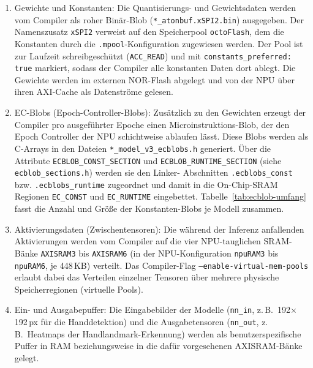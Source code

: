\begin{enumerate}
  \item Gewichte und Konstanten: Die Quantisierungs- und Gewichtsdaten werden vom Compiler als roher Binär-Blob (\texttt{*\_atonbuf.xSPI2.bin}) ausgegeben. Der Namenszusatz \texttt{xSPI2} verweist auf den Speicherpool \texttt{octoFlash}, dem die Konstanten durch die \texttt{.mpool}-Konfiguration zugewiesen werden. Der Pool ist zur Laufzeit schreibgeschützt (\texttt{ACC\_READ}) und mit \texttt{constants\_preferred: true} markiert, sodass der Compiler alle konstanten Daten dort ablegt. Die Gewichte werden im externen NOR-Flash abgelegt und von der NPU über ihren AXI-Cache als Datenströme gelesen.

  \item EC-Blobs (Epoch-Controller-Blobs): Zusätzlich zu den Gewichten erzeugt der Compiler pro ausgeführter Epoche einen Microinstruktions-Blob, der den Epoch Controller der NPU schichtweise ablaufen lässt. Diese Blobs werden als C-Arrays in den Dateien \texttt{*\_model\_v3\_ecblobs.h} generiert. Über die Attribute \texttt{ECBLOB\_CONST\_SECTION} und \texttt{ECBLOB\_RUNTIME\_SECTION} (siehe \texttt{ecblob\_sections.h}) werden sie den Linker- \linebreak Abschnitten \texttt{.ecblobs\_const} bzw. \texttt{.ecblobs\_runtime} zugeordnet und damit in die On-Chip-SRAM Regionen \texttt{EC\_CONST} und \texttt{EC\_RUNTIME} eingebettet. Tabelle~\ref{tab:ecblob-umfang} fasst die Anzahl und Größe der Konstanten-Blobs je Modell zusammen.

  \item Aktivierungsdaten (Zwischentensoren): Die während der Inferenz anfallenden Aktivierungen werden vom Compiler auf die vier NPU-tauglichen SRAM-Bänke \texttt{AXISRAM3} bis \texttt{AXISRAM6} (in der NPU-Konfiguration \texttt{npuRAM3} bis \texttt{npuRAM6}, je 448\,KB) verteilt. Das Compiler-Flag \texttt{--enable-virtual-mem-pools} erlaubt dabei das Verteilen einzelner Tensoren über mehrere physische Speicherregionen (virtuelle Pools).

  \item Ein- und Ausgabepuffer: Die Eingabebilder der Modelle (\texttt{nn\_in}, z.\,B.\ 192$\times$192\,px für die Handdetektion) und die Ausgabetensoren (\texttt{nn\_out}, z.\,B.\ Heatmaps der Handlandmark-Erkennung) werden als benutzerspezifische Puffer in RAM beziehungsweise in die dafür vorgesehenen AXISRAM-Bänke gelegt.
\end{enumerate}

